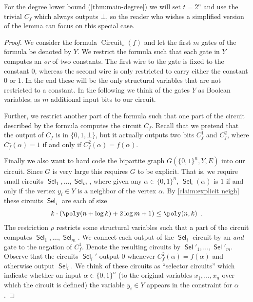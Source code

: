 \documentclass[10pt,a4paper]{article}
\theoremstyle{plain}
\theoremstyle{remark}
\theoremstyle{definition}
\newcommand{\eqperiod}{\enspace .}
\newcommand{\set}[1]{\{#1\}}
\DeclareMathOperator{\sel}{\mathsf{Sel}}
\DeclareMathOperator{\circuit}{Circuit}
\begin{document}
For the degree lower bound (\cref{thm:main-degree}) we will set $t =
2^n$ and use the trivial $C_f$ which always outputs $\bot$, so the
reader who wishes a simplified version of the lemma can focus on this
special case.

\begin{proof}
  We consider the formula $\circuit_s(f)$ and let the first $m$ gates
  of the formula be denoted by $Y$. We restrict the formula such that
  each gate in $Y$ computes an \emph{or} of two constants. The first
  wire to the gate is fixed to the constant $0$, whereas the second
  wire is only restricted to carry either the constant $0$ or $1$.  In
  the end these will be the only structural variables that are not
  restricted to a constant. In the following we think of the gates $Y$
  as Boolean variables; as $m$ additional input bits to our circuit.

  Further, we restrict another part of the formula such that one part
  of the circuit described by the formula computes the circuit
  $C_f$. Recall that we pretend that the output of $C_f$ is in
  $\set{0,1,\bot}$, but it actually outputs two bits $C_f^1$ and
  $C_f^2$, where $C_f^1(\alpha) = 1$ if and only
  if $C_f^2(\alpha) = f(\alpha)$.

  Finally we also want to hard code the bipartite graph
  $G(\set{0,1}^n, Y, E)$ into our circuit. Since $G$ is very large
  this requires $G$ to be explicit. That is, we require small circuits
  $\sel_1, \ldots, \sel_{m}$, where given any $\alpha \in \set{0,1}^n$, $\sel_i(\alpha)$ is $1$ if and only if the vertex $y_i \in Y$ is a
  neighbor of the vertex $\alpha$.
  By \cref{claim:explicit neigh} these circuits $\sel_i$ are each of size
  \[
    k \cdot \left( \poly(n + \log k) + 2 \log m + 1 \right)
    \le \poly(n, k) \eqperiod
  \]
  The restriction $\rho$ restricts some structural variables such that
  a part of the circuit computes $\sel_1, \ldots, \sel_m$. We connect
  each output of the $\sel_i$ circuit by an \emph{and} gate to the
  negation of $C_f^1$. Denote the resulting circuits by
  $\sel'_1, \ldots, \sel'_m$.  Observe that the circuits $\sel_i'$
  output $0$ whenever $C_f^2(\alpha) = f(\alpha)$ and otherwise output
  $\sel_i$. We think of these circuits as ``selector circuits'' which
  indicate whether on input $\alpha \in \set{0,1}^n$ (to the original
  variables $x_1,\ldots, x_n$ over which the circuit is defined) the
  variable $y_i \in Y$ appears in the constraint for $\alpha$.


\end{proof}
\end{document}

